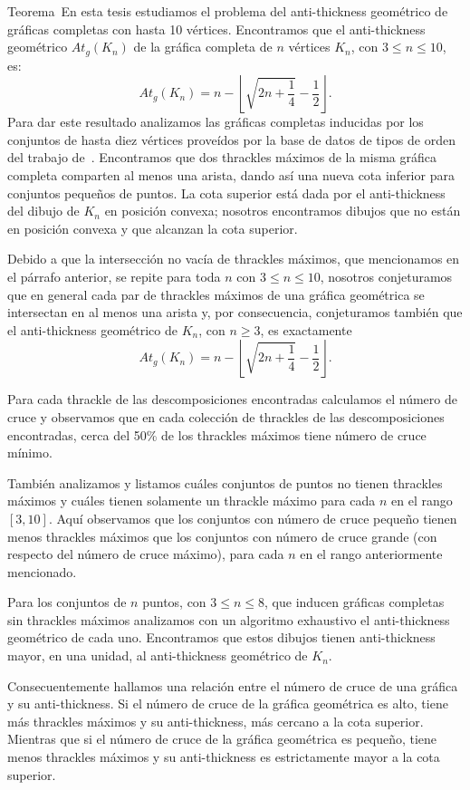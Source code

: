 Teorema~En esta tesis estudiamos el problema del anti-thickness geométrico de gráficas completas con hasta 10
vértices. Encontramos que el anti-thickness geométrico $At_g(K_n)$ de la gráfica completa de $n$
vértices $K_n$, con $ 3 \leq n \leq 10$, es:
\[ At_g(K_n) =  n - \left\lfloor \sqrt{2n + \frac{1}{4}} - \frac{1}{2}\right\rfloor. \]
Para dar este resultado analizamos las gráficas completas inducidas por los conjuntos de hasta diez
vértices proveídos por la base de datos de tipos de orden del trabajo de~\cite{Aichholzer2001}. Encontramos
que dos thrackles máximos de la misma gráfica completa comparten al menos una arista, dando así una nueva
cota inferior para conjuntos pequeños de puntos. La cota superior está dada por el anti-thickness del
dibujo de $K_n$ en posición convexa; nosotros encontramos dibujos que no están en posición convexa y que
alcanzan la cota superior.

Debido a que la intersección no vacía de thrackles máximos, que mencionamos en el párrafo anterior, se
repite para toda $n$ con $3 \leq n \leq 10$,  nosotros conjeturamos que en general cada par de thrackles
máximos de una gráfica geométrica se intersectan en al menos una arista y, por consecuencia, conjeturamos
también que el anti-thickness geométrico de $K_n$, con $n \geq 3$, es exactamente
\[ At_g(K_n) =  n - \left\lfloor \sqrt{2n + \frac{1}{4}} - \frac{1}{2}\right\rfloor. \]

Para cada thrackle de las descomposiciones encontradas calculamos el número
de cruce y observamos que en cada colección de thrackles de las descomposiciones encontradas, cerca del
50\% de los thrackles máximos tiene número de cruce mínimo.

También analizamos y listamos cuáles conjuntos de puntos no tienen thrackles máximos y cuáles tienen
solamente un thrackle máximo para cada $n$ en el rango $[3,10]$. Aquí observamos que los
conjuntos con número de cruce pequeño tienen menos thrackles máximos que los conjuntos con número de
cruce grande (con respecto del número de cruce máximo), para cada $n$ en el rango anteriormente mencionado.

Para los conjuntos de $n$ puntos, con $3 \leq n \leq 8$, que inducen gráficas completas sin thrackles
máximos analizamos con un algoritmo exhaustivo el anti-thickness geométrico de cada uno. Encontramos que
estos dibujos tienen anti-thickness mayor, en una unidad, al anti-thickness geométrico de $K_n$.

Consecuentemente hallamos una relación entre el número de cruce de una gráfica y su anti-thickness. Si el
número de cruce de la gráfica geométrica es alto, tiene más thrackles máximos y su anti-thickness, más
cercano a la cota superior. Mientras que si el número de cruce de la gráfica geométrica es pequeño, tiene
menos thrackles máximos y su anti-thickness es estrictamente mayor a la cota superior.

